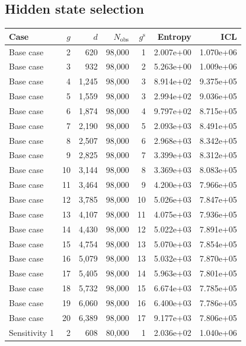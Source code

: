 \subsection{Hidden state selection}
\begin{table}
 \centering
 \begin{tabular}{lrrrrrr}
 \toprule
  Case & $g$ & $d$ & $N_{\mathrm{obs}}$ & $g^{\mathrm{s}}$ & Entropy & ICL \\
 \midrule
  Base case & 2 & 620 &  98,000 &   1 & 2.007e+00 & 1.070e+06 \\
  Base case & 3 & 932 &  98,000 &   2 & 5.263e+00 & 1.009e+06 \\
  Base case & 4 & 1,245 &  98,000 &   3 & 8.914e+02 & 9.375e+05 \\
  Base case & 5 & 1,559 &  98,000 &   3 & 2.994e+02 & 9.036e+05 \\
  Base case & 6 & 1,874 &  98,000 &   4 & 9.797e+02 & 8.715e+05 \\
  Base case & 7 & 2,190 &  98,000 &   5 & 2.093e+03 & 8.491e+05 \\
  Base case & 8 & 2,507 &  98,000 &   6 & 2.968e+03 & 8.342e+05 \\
  Base case & 9 & 2,825 &  98,000 &   7 & 3.399e+03 & 8.312e+05 \\
  Base case & 10 & 3,144 &  98,000 &   8 & 3.369e+03 & 8.083e+05 \\
  Base case & 11 & 3,464 &  98,000 &   9 & 4.200e+03 & 7.966e+05 \\
  Base case & 12 & 3,785 &  98,000 &   10 & 5.026e+03 & 7.847e+05 \\
  Base case & 13 & 4,107 &  98,000 &   11 & 4.075e+03 & 7.936e+05 \\
  Base case & 14 & 4,430 &  98,000 &   12 & 5.022e+03 & 7.891e+05 \\
  Base case & 15 & 4,754 &  98,000 &   13 & 5.070e+03 & 7.854e+05 \\
  Base case & 16 & 5,079 &  98,000 &   13 & 5.032e+03 & 7.870e+05 \\
  Base case & 17 & 5,405 &  98,000 &   14 & 5.963e+03 & 7.801e+05 \\
  Base case & 18 & 5,732 &  98,000 &   15 & 6.674e+03 & 7.785e+05 \\
  Base case & 19 & 6,060 &  98,000 &   16 & 6.400e+03 & 7.786e+05 \\
  Base case & 20 & 6,389 &  98,000 &   17 & 9.177e+03 & 7.806e+05 \\
 Sensitivity 1 & 2 & 608 &  80,000 &   1 & 2.036e+02 & 1.040e+06 \\

\end{tabular}
\end{table}
